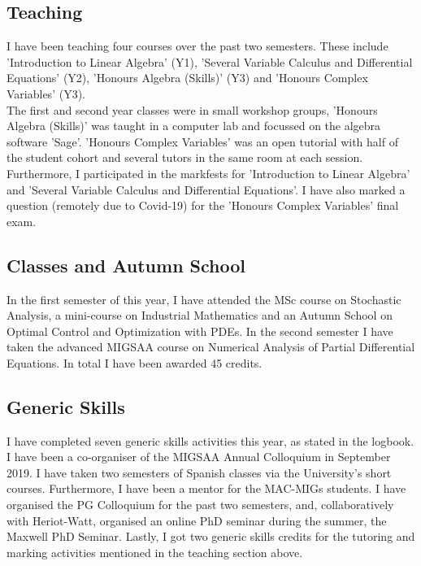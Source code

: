 \documentclass[11pt, a4paper]{article}
\theoremstyle{definition}
\begin{document}
\subsection{Teaching}
I have been teaching four courses over the past two semesters. These include 'Introduction to Linear Algebra' (Y1), 'Several Variable Calculus and Differential Equations' (Y2), 'Honours Algebra (Skills)' (Y3) and 'Honours Complex Variables' (Y3).\\
The first and second year classes were in small workshop groups, 'Honours Algebra (Skills)' was taught in a computer lab and focussed on the algebra software 'Sage'. 'Honours Complex Variables' was an open tutorial with half of the student cohort and several tutors in the same room at each session.\\
Furthermore, I participated in the markfests for 'Introduction to Linear Algebra' and 'Several Variable Calculus and Differential Equations'. I have also marked a question (remotely due to Covid-19) for the 'Honours Complex Variables' final exam.
\subsection{Classes and Autumn School}
In the first semester of this year, I have attended the MSc course on Stochastic Analysis, a mini-course on Industrial Mathematics and an Autumn School on Optimal Control and Optimization with PDEs. In the second semester I have taken the advanced MIGSAA course on Numerical Analysis of Partial Differential Equations. In total I have been awarded 45 credits.
\subsection{Generic Skills}
I have completed seven generic skills activities this year, as stated in the logbook. I have been a co-organiser of the MIGSAA Annual Colloquium in September 2019. I have taken two semesters of Spanish classes via the University's short courses. Furthermore, I have been a mentor for the MAC-MIGs students. I have organised the PG Colloquium for the past two semesters, and, collaboratively with Heriot-Watt, organised an online PhD seminar during the summer, the Maxwell PhD Seminar.
Lastly, I got two generic skills credits for the tutoring and marking activities mentioned in the teaching section above.
\end{document}
